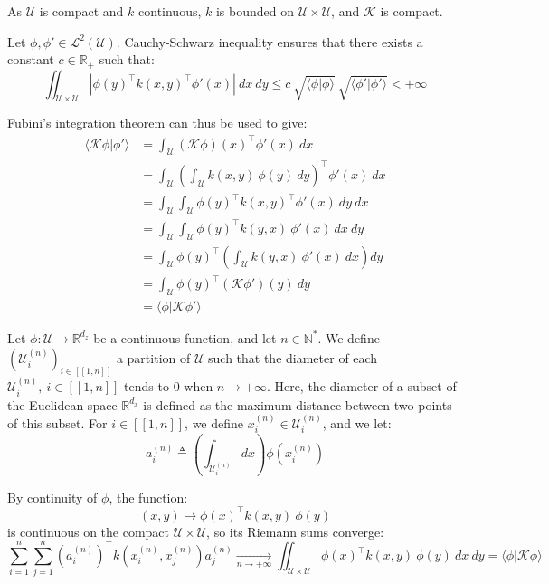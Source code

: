 As $\mathcal{U}$ is compact and $k$ continuous, $k$ is bounded on $\mathcal{U}\times\mathcal{U}$, and $\mathcal{K}$ is compact.

Let $\phi,\phi'\in\mathcal{L}^2(\mathcal{U})$. Cauchy-Schwarz inequality ensures that there exists a constant $c\in\mathbb{R}_+$ such that:
\begin{equation}
	\iint_{\mathcal{U}\times\mathcal{U}}{\left|\phi(y)^\top k(x,y)^\top\phi'(x)\right|\:dx\:dy}\leq c\:\sqrt{\langle\phi|\phi\rangle}\:\sqrt{\langle\phi'|\phi'\rangle}<+\infty
\end{equation}

Fubini's integration theorem can thus be used to give:
\begin{equation}
	\begin{aligned}
	\langle\mathcal{K}\phi|\phi'\rangle&=\int_{\mathcal{U}}{(\mathcal{K}\phi)(x)^\top\phi'(x)\:dx}\\
	&=\int_{\mathcal{U}}{\left(\int_{\mathcal{U}}{k(x,y)\:\phi(y)\:dy}\right)^\top\phi'(x)\:dx}\\
	&=\int_{\mathcal{U}}{\int_{\mathcal{U}}{\phi(y)^\top k(x,y)^\top\phi'(x)\:dy}\:dx}\\
	&=\int_{\mathcal{U}}{\int_{\mathcal{U}}{\phi(y)^\top k(y,x)\:\phi'(x)\:dx}\:dy}\\
	&=\int_{\mathcal{U}}{\phi(y)^\top\left(\int_{\mathcal{U}}{k(y,x)\:\phi'(x)\:dx}\right)dy}\\
	&=\int_{\mathcal{U}}{\phi(y)^\top(\mathcal{K}\phi')(y)\:dy}\\
	&=\langle\phi|\mathcal{K}\phi'\rangle
	\end{aligned}
\end{equation}

Let $\phi:\mathcal{U}\to\mathbb{R}^{d_z}$ be a continuous function, and let $n\in\mathbb{N}^*$. We define $\left(\mathcal{U}_i^{(n)}\right)_{i\in[\![1,n]\!]}$ a partition of $\mathcal{U}$ such that the diameter of each $\mathcal{U}_i^{(n)},\:i\in[\![1,n]\!]$ tends to $0$ when $n\to+\infty$. Here, the diameter of a subset of the Euclidean space $\mathbb{R}^{d_x}$ is defined as the maximum distance between two points of this subset. For $i\in[\![1,n]\!]$, we define $x_i^{(n)}\in\mathcal{U}_i^{(n)}$, and we let:
\begin{equation}
	a_i^{(n)}\triangleq\left(\int_{\mathcal{U}_i^{(n)}}{dx}\right)\phi\!\left(x_i^{(n)}\right)
\end{equation}

By continuity of $\phi$, the function:
\begin{equation}
	(x,y)\mapsto \phi(x)^\top k(x,y)\:\phi(y)
\end{equation}
is continuous on the compact $\mathcal{U}\times\mathcal{U}$, so its Riemann sums converge:
\begin{equation}
	\sum_{i=1}^n\sum_{j=1}^n\left(a_i^{(n)}\right)^\top k\left(x_i^{(n)},x_j^{(n)}\right)a_j^{(n)}\underset{n\to+\infty}{\longrightarrow}\iint_{\mathcal{U}\times\mathcal{U}}{\phi(x)^\top k(x,y)\:\phi(y)\:dx\:dy}=\langle\phi|\mathcal{K}\phi\rangle
\end{equation}

